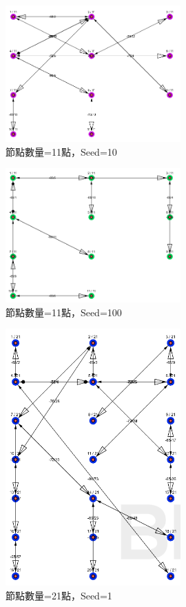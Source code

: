 \begin{ZhChapter}
\begin{figure}[H]
    \centering
    \includegraphics[width = 0.6\textwidth]{image/模擬實驗11點seed=10.png}
    \caption{節點數量=11點，Seed=10}
    \label{fig: 模擬實驗11點seed=10}
\end{figure}

\begin{figure}[H]
    \centering
    \includegraphics[width = 0.6\textwidth]{image/模擬實驗11點seed=100.png}
    \caption{節點數量=11點，Seed=100}
    \label{fig: 模擬實驗11點seed=100}
\end{figure}

\begin{figure}[H]
    \centering
    \includegraphics[width = 0.6\textwidth]{image/模擬實驗21點seed=1.png}
    \caption{節點數量=21點，Seed=1}
    \label{fig: 模擬實驗21點seed=1}
\end{figure}


\end{ZhChapter}
